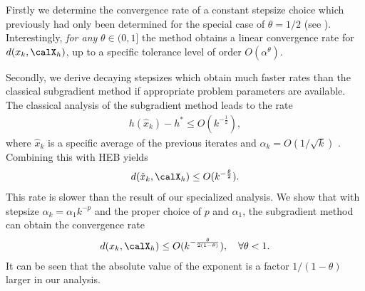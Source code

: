 \documentclass[smallextended]{svjour3}
\begin{document}
Firstly we determine the convergence rate of a constant stepsize choice which previously had only been determined for the special case of $\theta=1/2$ (see \cite[Prop. 2.4]{nedic2001convergence}). Interestingly, \emph{for any} $\theta\in(0,1]$ the method obtains a linear convergence rate for $d(x_k,\calX_h)$, up to a specific tolerance level of order $O(\alpha^{\theta})$. %

Secondly, we derive decaying stepsizes which obtain much faster rates than the classical subgradient method if appropriate problem parameters are available.
The classical analysis of the subgradient method leads to the rate
\begin{eqnarray*}
h(\hat{x}_k)-h^*\leq O(k^{-\frac{1}{2}}),
\end{eqnarray*}
where $\hat{x}_k$ is a specific average of the previous iterates and $\alpha_k=O(1/\sqrt{k})$ \cite{nemirovski2009robust}. Combining this with HEB yields
\begin{eqnarray*}\label{ConvClassic}
d(\hat{x}_k,\calX_h)\leq O(k^{-\frac{\theta}{2}}).
\end{eqnarray*}
This rate is slower than the result of our specialized analysis. We show that with stepsize $\alpha_k=\alpha_1 k^{-p}$ and the proper choice of $p$ and $\alpha_1$, the subgradient method can obtain the convergence rate
\begin{eqnarray}\label{optDecay}
d(x_k,\calX_h)\leq O(k^{-\frac{\theta}{2(1-\theta)}}),\quad\forall \theta<1.
\end{eqnarray}
It can be seen that the absolute value of the exponent is a factor $1/(1-\theta)$ larger in our analysis. 
\end{document}
